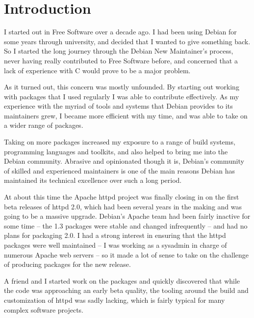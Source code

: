 

\section*{Introduction}
I started out in Free Software over a decade ago. I had been using Debian for
some years through university, and decided that I wanted to give something back.
So I started the long journey through the Debian New Maintainer's process, never
having really contributed to Free Software before, and concerned that a lack of
experience with C would prove to be a major problem.

As it turned out, this concern was mostly unfounded. By starting out working
with packages that I used regularly I was able to contribute effectively. As my
experience with the myriad of tools and systems that Debian provides to its
maintainers grew, I became more efficient with my time, and was able to take on
a wider range of packages. 

Taking on more packages increased my exposure to a range of build systems,
programming languages and toolkits, and also helped to bring me into the Debian
community. Abrasive and opinionated though it is, Debian's community of skilled
and experienced maintainers is one of the main reasons Debian has maintained its
technical excellence over such a long period.

At about this time the Apache httpd project was finally closing in on the first
beta releases of httpd 2.0, which had been several years in the making and was
going to be a massive upgrade. Debian's Apache team had been fairly inactive for
some time -- the 1.3 packages were stable and changed infrequently -- and had no
plans for packaging 2.0. 
I had a strong interest in ensuring that the httpd packages were well maintained
-- I was working as a sysadmin in charge of numerous Apache web servers -- so it
made a lot of sense to take on the challenge of producing packages for the new
release. 

A friend and I started work on the packages and quickly discovered that while
the code was approaching an early beta quality, the tooling around the build and
customization of httpd was sadly lacking, which is fairly typical for many
complex software projects. 


